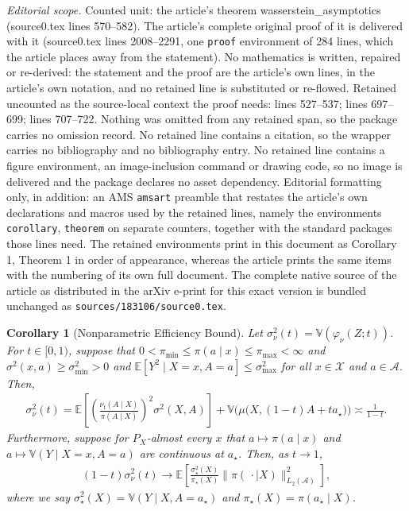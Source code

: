 \documentclass[10pt,a4paper]{amsart}
\newtheorem{corollary}{Corollary}
\begin{document}
\noindent\textit{Editorial scope.} Counted unit: the article's theorem wasserstein\_asymptotics (source0.tex lines 570--582). The article's complete original proof of it is delivered with it (source0.tex lines 2008--2291, one \texttt{proof} environment of 284 lines, which the article places away from the statement). No mathematics is written, repaired or re-derived: the statement and the proof are the article's own lines, in the article's own notation, and no retained line is substituted or re-flowed.  Retained uncounted as the source-local context the proof needs: lines 527--537; lines 697--699; lines 707--722.  Nothing was omitted from any retained span, so the package carries no omission record.  No retained line contains a citation, so the wrapper carries no bibliography and no bibliography entry.  No retained line contains a figure environment, an image-inclusion command or drawing code, so no image is delivered and the package declares no asset dependency.  Editorial formatting only, in addition: an AMS \texttt{amsart} preamble that restates the article's own declarations and macros used by the retained lines, namely the environments \texttt{corollary}, \texttt{theorem} on separate counters, together with the standard packages those lines need.  The retained environments print in this document as Corollary 1, Theorem 1 in order of appearance, whereas the article prints the same items with the numbering of its own full document.  The complete native source of the article as distributed in the arXiv e-print for this exact version is bundled unchanged as \texttt{sources/183106/source0.tex}.
\begin{corollary}[Nonparametric Efficiency Bound] \label{var_corollary}
    Let $\sigma^2_\nu(t) = \mathbb{V}(\varphi_\nu(Z; t))$. For $t \in [0, 1)$, suppose that $0 < \pi_{\min} \leq \pi(a \! \mid \! x) \leq \pi_{\max} < \infty$ and $\sigma^2(x, a) \geq \sigma^2_{\min} > 0$ and $\mathbb{E}[Y^2 \mid X = x, A = a] \leq \sigma^2_{\max}$ for all $x \in \mathcal{X}$ and $a \in \mathcal{A}$.  Then, 
    \begin{align*}
    \sigma^2_\nu(t) = \mathbb{E}\! \left[ \left(\frac{\nu_t(A\mid X)}{\pi(A\mid X)}\right)^2 \sigma^2(X, A)  \right] + \mathbb{V}\big(\mu\big(X, (1 - t)A + ta_\star\big)\big) \asymp \frac{1}{1-t} .
    \end{align*}
    Furthermore, suppose for $P_X$-almost every $x$ that $a \mapsto \pi(a \! \mid \! x)$ and $a \mapsto \mathbb{V}(Y \mid X = x, A=a)$ are continuous at $a_\star$. Then, as $t \to 1$,
    \begin{align*}
        (1-t)\sigma^2_\nu(t) \longrightarrow  \mathbb{E}\! \left[\frac{\sigma^2_\star(X)}{\pi_\star(X)} \| \pi(\, \cdot \mid X) \|^2_{L_2(\mathcal{A})} \right],
    \end{align*}
where we say $\sigma^2_\star(X) = \mathbb{V}(Y \mid X, A = a_\star)$ and $\pi_{\star}(X) = \pi(a_\star \mid X)$.
\end{corollary}
\end{document}
